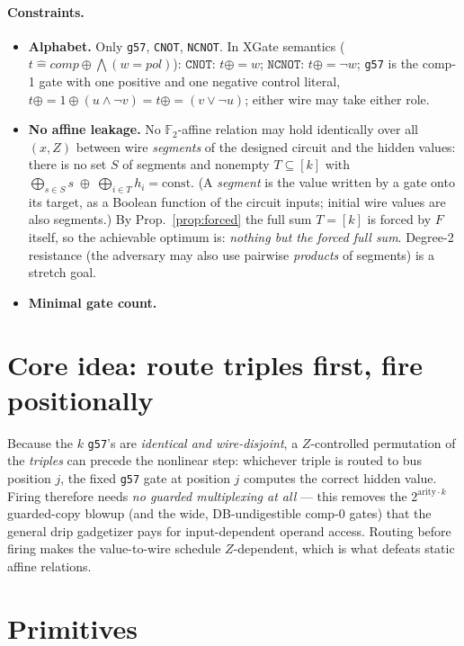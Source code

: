 \documentclass[11pt]{article}
\theoremstyle{remark}
\newcommand{\g}{\texttt{g57}}
\newcommand{\CNOT}{\texttt{CNOT}}
\newcommand{\NCNOT}{\texttt{NCNOT}}
\newcommand{\F}{\mathbb{F}_2}
\begin{document}
\paragraph{Constraints.}
\begin{itemize}
\item[(a)] \textbf{Alphabet.} Only \g, \CNOT, \NCNOT. In XGate semantics
($t \mathrel{\hat=} \mathit{comp}\oplus\bigwedge(w{=}\mathit{pol})$):
$\CNOT$: $t\mathrel{\oplus{=}}w$; $\NCNOT$: $t\mathrel{\oplus{=}}\neg w$; \g{} is the comp-1
gate with one positive and one negative control literal, $t\mathrel{\oplus{=}}1\oplus(u\wedge\neg v)
= t\mathrel{\oplus{=}}(v\vee\neg u)$; either wire may take either role.
\item[(b)] \textbf{No affine leakage.} No $\F$-affine relation may hold identically over all
$(x,Z)$ between wire \emph{segments} of the designed circuit and the hidden values: there is no
set $S$ of segments and nonempty $T\subseteq[k]$ with
$\bigoplus_{s\in S}s\;\oplus\;\bigoplus_{i\in T}h_i=\mathrm{const}$.
(A \emph{segment} is the value written by a gate onto its target, as a Boolean function of the
circuit inputs; initial wire values are also segments.) By Prop.~\ref{prop:forced} the full sum
$T=[k]$ is forced by $F$ itself, so the achievable optimum is: \emph{nothing but the forced full
sum}. Degree-2 resistance (the adversary may also use pairwise \emph{products} of segments) is a
stretch goal.
\item[(c)] \textbf{Minimal gate count.}
\end{itemize}

\section{Core idea: route triples first, fire positionally}

Because the $k$ \g's are \emph{identical and wire-disjoint}, a $Z$-controlled permutation of the
\emph{triples} can precede the nonlinear step: whichever triple is routed to bus position $j$,
the fixed \g{} gate at position $j$ computes the correct hidden value. Firing therefore needs
\emph{no guarded multiplexing at all} --- this removes the $2^{\text{arity}\cdot k}$ guarded-copy
blowup (and the wide, DB-undigestible comp-0 gates) that the general drip gadgetizer pays for
input-dependent operand access. Routing before firing makes the value-to-wire schedule
$Z$-dependent, which is what defeats static affine relations.

\section{Primitives}
\end{document}
